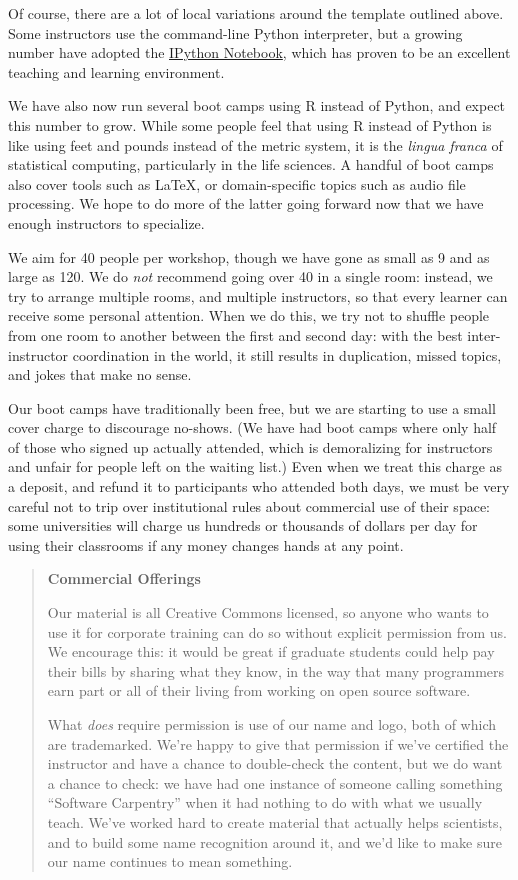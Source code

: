 \documentclass[10pt,a4paper,twocolumn]{article}
\begin{document}
Of course, there are a lot of local variations around the template
outlined above. Some instructors use the command-line Python
interpreter, but a growing number have adopted the
\href{http://ipython.org/notebook.html}{IPython Notebook}, which has
proven to be an excellent teaching and learning environment.

We have also now run several boot camps using R instead of Python, and
expect this number to grow. While some people feel that using R instead
of Python is like using feet and pounds instead of the metric system, it
is the \emph{lingua franca} of statistical computing, particularly in
the life sciences. A handful of boot camps also cover tools such as
LaTeX, or domain-specific topics such as audio file processing. We hope
to do more of the latter going forward now that we have enough
instructors to specialize.

We aim for 40 people per workshop, though we have gone as small as 9 and
as large as 120. We do \emph{not} recommend going over 40 in a single
room: instead, we try to arrange multiple rooms, and multiple
instructors, so that every learner can receive some personal attention.
When we do this, we try not to shuffle people from one room to another
between the first and second day: with the best inter-instructor
coordination in the world, it still results in duplication, missed
topics, and jokes that make no sense.

Our boot camps have traditionally been free, but we are starting to use
a small cover charge to discourage no-shows. (We have had boot camps
where only half of those who signed up actually attended, which is
demoralizing for instructors and unfair for people left on the waiting
list.) Even when we treat this charge as a deposit, and refund it to
participants who attended both days, we must be very careful not to trip
over institutional rules about commercial use of their space: some
universities will charge us hundreds or thousands of dollars per day for
using their classrooms if any money changes hands at any point.

\begin{quote}
\textbf{Commercial Offerings}

Our material is all Creative Commons licensed, so anyone who wants to
use it for corporate training can do so without explicit permission from
us. We encourage this: it would be great if graduate students could help
pay their bills by sharing what they know, in the way that many
programmers earn part or all of their living from working on open source
software.

What \emph{does} require permission is use of our name and logo, both of
which are trademarked. We're happy to give that permission if we've
certified the instructor and have a chance to double-check the content,
but we do want a chance to check: we have had one instance of someone
calling something ``Software Carpentry'' when it had nothing to do with
what we usually teach. We've worked hard to create material that
actually helps scientists, and to build some name recognition around it,
and we'd like to make sure our name continues to mean something.
\end{quote}
\end{document}
